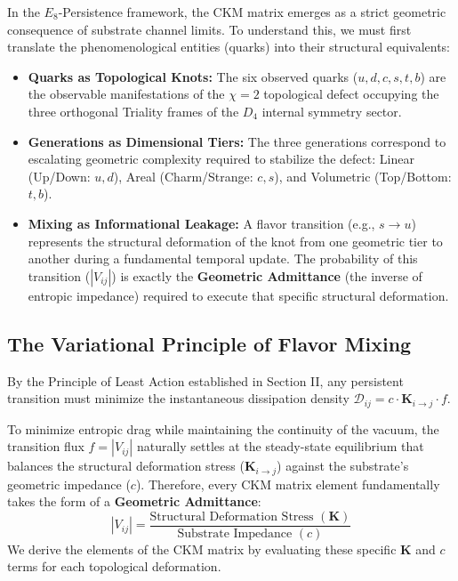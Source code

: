In the $E_8$-Persistence framework, the CKM matrix emerges as a strict geometric consequence of substrate channel limits. To understand this, we must first translate the phenomenological entities (quarks) into their structural equivalents:
\begin{itemize}
    \item \textbf{Quarks as Topological Knots:} The six observed quarks ($u, d, c, s, t, b$) are the observable manifestations of the $\chi=2$ topological defect occupying the three orthogonal Triality frames of the $D_4$ internal symmetry sector. 
    \item \textbf{Generations as Dimensional Tiers:} The three generations correspond to escalating geometric complexity required to stabilize the defect: Linear (Up/Down: $u, d$), Areal (Charm/Strange: $c, s$), and Volumetric (Top/Bottom: $t, b$).
    \item \textbf{Mixing as Informational Leakage:} A flavor transition (e.g., $s \rightarrow u$) represents the structural deformation of the knot from one geometric tier to another during a fundamental temporal update. The probability of this transition ($|V_{ij}|$) is exactly the \textbf{Geometric Admittance} (the inverse of entropic impedance) required to execute that specific structural deformation.
\end{itemize}

\subsection{The Variational Principle of Flavor Mixing}
By the Principle of Least Action established in Section II, any persistent transition must minimize the instantaneous dissipation density $\mathcal{D}_{ij} = c \cdot \mathbf{K}_{i \to j} \cdot f$.

To minimize entropic drag while maintaining the continuity of the vacuum, the transition flux $f = |V_{ij}|$ naturally settles at the steady-state equilibrium that balances the structural deformation stress ($\mathbf{K}_{i \to j}$) against the substrate's geometric impedance ($c$). Therefore, every CKM matrix element fundamentally takes the form of a \textbf{Geometric Admittance}:
\begin{equation}
    |V_{ij}| = \frac{\text{Structural Deformation Stress } (\mathbf{K})}{\text{Substrate Impedance } (c)}
\end{equation}
We derive the elements of the CKM matrix by evaluating these specific $\mathbf{K}$ and $c$ terms for each topological deformation.


